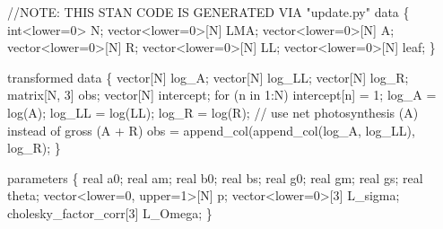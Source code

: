 \documentclass[
  12pt,
  letterpaper,
  DIV=11,
  numbers=noendperiod]{scrartcl}
\newenvironment{Shaded}{\begin{snugshade}}{\end{snugshade}}
\newcommand{\AlertTok}[1]{\textcolor[rgb]{0.68,0.00,0.00}{#1}}
\newcommand{\CommentTok}[1]{\textcolor[rgb]{0.37,0.37,0.37}{#1}}
\newcommand{\ControlFlowTok}[1]{\textcolor[rgb]{0.00,0.23,0.31}{#1}}
\newcommand{\DataTypeTok}[1]{\textcolor[rgb]{0.68,0.00,0.00}{#1}}
\newcommand{\DecValTok}[1]{\textcolor[rgb]{0.68,0.00,0.00}{#1}}
\newcommand{\KeywordTok}[1]{\textcolor[rgb]{0.00,0.23,0.31}{#1}}
\newcommand{\NormalTok}[1]{\textcolor[rgb]{0.00,0.23,0.31}{#1}}
\begin{document}
\begin{Shaded}
\begin{Highlighting}[]
\CommentTok{//}\AlertTok{NOTE}\CommentTok{: THIS STAN CODE IS GENERATED VIA "update.py"}
\KeywordTok{data}\NormalTok{ \{}
  \DataTypeTok{int}\NormalTok{\textless{}}\KeywordTok{lower}\NormalTok{=}\DecValTok{0}\NormalTok{\textgreater{} N;}
  \DataTypeTok{vector}\NormalTok{\textless{}}\KeywordTok{lower}\NormalTok{=}\DecValTok{0}\NormalTok{\textgreater{}[N] LMA;}
  \DataTypeTok{vector}\NormalTok{\textless{}}\KeywordTok{lower}\NormalTok{=}\DecValTok{0}\NormalTok{\textgreater{}[N] A;}
  \DataTypeTok{vector}\NormalTok{\textless{}}\KeywordTok{lower}\NormalTok{=}\DecValTok{0}\NormalTok{\textgreater{}[N] R;}
  \DataTypeTok{vector}\NormalTok{\textless{}}\KeywordTok{lower}\NormalTok{=}\DecValTok{0}\NormalTok{\textgreater{}[N] LL;}
  \DataTypeTok{vector}\NormalTok{\textless{}}\KeywordTok{lower}\NormalTok{=}\DecValTok{0}\NormalTok{\textgreater{}[N] leaf;}
\NormalTok{\}}

\KeywordTok{transformed data}\NormalTok{ \{}
  \DataTypeTok{vector}\NormalTok{[N] log\_A;}
  \DataTypeTok{vector}\NormalTok{[N] log\_LL;}
  \DataTypeTok{vector}\NormalTok{[N] log\_R;}
  \DataTypeTok{matrix}\NormalTok{[N, }\DecValTok{3}\NormalTok{] obs;}
  \DataTypeTok{vector}\NormalTok{[N] intercept;}
  \ControlFlowTok{for}\NormalTok{ (n }\ControlFlowTok{in} \DecValTok{1}\NormalTok{:N)}
\NormalTok{    intercept[n] = }\DecValTok{1}\NormalTok{;}
\NormalTok{  log\_A = log(A);}
\NormalTok{  log\_LL = log(LL);}
\NormalTok{  log\_R = log(R);}
  \CommentTok{// use net photosynthesis (A) instead of gross (A + R)}
\NormalTok{  obs = append\_col(append\_col(log\_A, log\_LL), log\_R);}
\NormalTok{\}}

\KeywordTok{parameters}\NormalTok{ \{}
  \DataTypeTok{real}\NormalTok{ a0;}
  \DataTypeTok{real}\NormalTok{ am;}
  \DataTypeTok{real}\NormalTok{ b0;}
  \DataTypeTok{real}\NormalTok{ bs;}
  \DataTypeTok{real}\NormalTok{ g0;}
  \DataTypeTok{real}\NormalTok{ gm;}
  \DataTypeTok{real}\NormalTok{ gs;}
  \DataTypeTok{real}\NormalTok{ theta;}
  \DataTypeTok{vector}\NormalTok{\textless{}}\KeywordTok{lower}\NormalTok{=}\DecValTok{0}\NormalTok{, }\KeywordTok{upper}\NormalTok{=}\DecValTok{1}\NormalTok{\textgreater{}[N] p;}
  \DataTypeTok{vector}\NormalTok{\textless{}}\KeywordTok{lower}\NormalTok{=}\DecValTok{0}\NormalTok{\textgreater{}[}\DecValTok{3}\NormalTok{] L\_sigma;}
  \DataTypeTok{cholesky\_factor\_corr}\NormalTok{[}\DecValTok{3}\NormalTok{] L\_Omega;}
\NormalTok{\}}


\end{Highlighting}
\end{Shaded}
\end{document}
